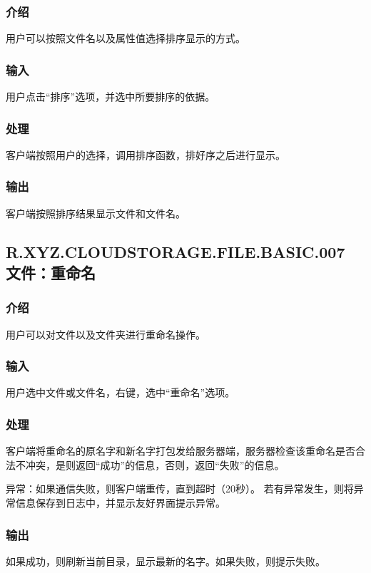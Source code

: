 \subsubsection{介绍} 
用户可以按照文件名以及属性值选择排序显示的方式。

\subsubsection{输入} 
用户点击“排序”选项，并选中所要排序的依据。

\subsubsection{处理}
客户端按照用户的选择，调用排序函数，排好序之后进行显示。

\subsubsection{输出}
客户端按照排序结果显示文件和文件名。



\subsection{R.XYZ.CLOUDSTORAGE.FILE.BASIC.007 文件：重命名}

\subsubsection{介绍} 
用户可以对文件以及文件夹进行重命名操作。

\subsubsection{输入} 
用户选中文件或文件名，右键，选中“重命名”选项。

\subsubsection{处理}
客户端将重命名的原名字和新名字打包发给服务器端，服务器检查该重命名是否合法不冲突，是则返回“成功”的信息，否则，返回“失败”的信息。

异常：如果通信失败，则客户端重传，直到超时（20秒）。
若有异常发生，则将异常信息保存到日志中，并显示友好界面提示异常。

\subsubsection{输出}
如果成功，则刷新当前目录，显示最新的名字。如果失败，则提示失败。



